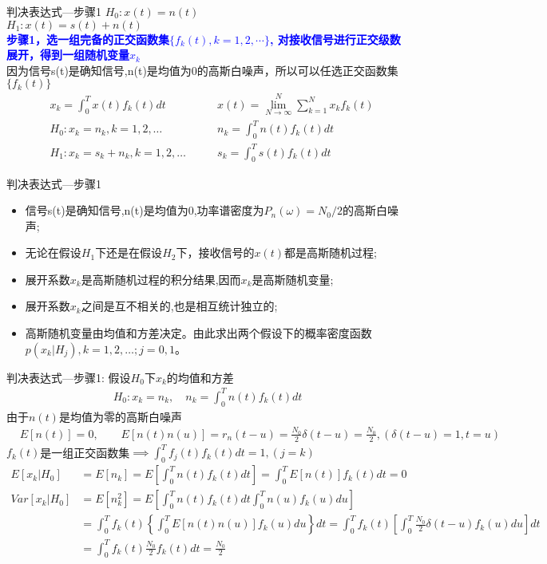 \begin{frame}{判决表达式---步骤1}
$H_0: x(t)=n(t)$\\
$H_1: x(t)=s(t)+n(t)$\\
\textbf{\textcolor{blue}{步骤1，选一组完备的正交函数集$\{f_k(t),k=1,2,\cdots \}$, 对接收信号进行正交级数展开，得到一组随机变量$x_k$}}\\
因为信号s(t)是确知信号,n(t)是均值为0的高斯白噪声，所以可以任选正交函数集$\{f_k(t)\}$
\begin{align*}
&x_k=\int_{0}^{T}x(t)f_k(t)dt &\qquad x(t)=\lim\limits_{N\to\infty}^N\sum\limits_{k=1}^Nx_kf_k(t)\\
&H_0: x_k=n_k,k=1,2,\dots &\qquad n_k=\int_{0}^{T}n(t)f_k(t)dt\\
&H_1: x_k=s_k+n_k,k=1,2,\dots &\qquad s_k=\int_{0}^{T}s(t)f_k(t)dt
\end{align*}
\end{frame}

\begin{frame}{判决表达式---步骤1}
\begin{itemize}
	\item 信号s(t)是确知信号,n(t)是均值为0,功率谱密度为$P_n(\omega)=N_0/2$的高斯白噪声;
	\item 无论在假设$H_1$下还是在假设$H_2$下，接收信号的$x(t)$都是高斯随机过程;
	\item 展开系数$x_k$是高斯随机过程的积分结果,因而$x_k$是高斯随机变量;
	\item 展开系数$x_k$之间是互不相关的,也是相互统计独立的;
	\item 高斯随机变量由均值和方差决定。由此求出两个假设下的概率密度函数$p(x_k|H_j),k=1,2,\dots;j=0,1$。
\end{itemize}
\end{frame}

\begin{frame}[shrink]{判决表达式---步骤1: 假设$H_0$下$x_k$的均值和方差}
\begin{align*}
H_0: x_k=n_k, \quad n_k=\int_{0}^{T}n(t)f_k(t)dt
\end{align*}
由于$n(t)$是均值为零的高斯白噪声
\begin{align*}
&E[n(t)]=0, \qquad E[n(t)n(u)]=r_n(t-u) =\frac{N_0}{2}\delta(t-u)=\frac{N_0}{2},(\delta(t-u)=1,t=u)
\end{align*}
$f_k(t)$是一组正交函数集$\implies\int_{0}^{T}f_j(t)f_k(t)dt=1,(j=k)$
\begin{align*}
E[x_k|H_0]&=E[n_k]=E\left[\int_{0}^{T}n(t)f_k(t)dt\right]=\int_{0}^{T}E[n(t)]f_k(t)dt=0\\
Var[x_k|H_0]&=E[n_k^2]=E\left[\int_{0}^{T}n(t)f_k(t)dt\int_{0}^{T}n(u)f_k(u)du\right]\\
&=\int_{0}^{T}f_k(t)\left\{\int_{0}^{T}E[n(t)n(u)]f_k(u)du\right\}dt=\int_{0}^{T}f_k(t)\left[\int_{0}^{T}\frac{N_0}{2}\delta(t-u)f_k(u)du\right]dt\\
&=\int_{0}^{T}f_k(t)\frac{N_0}{2}f_k(t)dt=\frac{N_0}{2}
\end{align*}
\end{frame}

